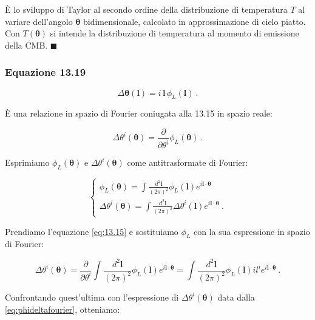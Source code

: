 \documentclass[a4paper,10pt]{article}
\newcommand{\B}{\boldsymbol}
\begin{document}
È lo sviluppo di Taylor al secondo ordine della distribuzione di temperatura $T$ al variare dell'angolo $\B\theta$ bidimensionale, calcolato in approssimazione di cielo piatto. 
Con $T(\B \theta)$ si intende la distribuzione di temperatura al momento di emissione della CMB. \hfill $\blacksquare$





\subsubsection*{Equazione 13.19}

\begin{equation} \label{eq:13.19}
    \Delta \B{\theta}(\B l) = i \, \B l \, \phi_L(\B l) \ .
\end{equation}

È una relazione in spazio di Fourier coniugata alla 13.15 in spazio reale:

\begin{equation} \label{eq:13.15}
    \Delta \theta^i (\B\theta) = \frac{\partial}{\partial \theta^i} \phi_L(\B \theta) \ .
\end{equation}

Esprimiamo $\phi_L(\B \theta)$ e $\Delta \theta^i (\B\theta)$ come antitrasformate di Fourier:

\begin{equation} \label{eq:phideltafourier}
\begin{cases}
    \phi_L(\B \theta) = \displaystyle \int \frac{d^2 \B l}{(2\pi)^2} \phi_L(\B l) e^{i \B l \cdot \B \theta} \\[3mm]
    \Delta \theta^i (\B\theta) = \displaystyle \int \frac{d^2 \B l}{(2\pi)^2} \Delta \theta^i (\B l) e^{i \B l \cdot \B \theta} \ .
\end{cases}
\end{equation}

Prendiamo l'equazione \eqref{eq:13.15} e sostituiamo $\phi_L$ con la sua espressione in spazio di Fourier:

\begin{equation}
    \Delta \theta^i (\B\theta) = 
    \frac{\partial}{\partial \theta^i} \displaystyle \int \frac{d^2 \B l}{(2\pi)^2} \phi_L (\B l) e^{i \B l \cdot \B \theta} = 
    \displaystyle \int \frac{d^2 \B l}{(2\pi)^2} \phi_L (\B l) i  l^i e^{i \B l \cdot \B \theta} \ .
\end{equation}

Confrontando quest'ultima con l'espressione di $\Delta \theta^i (\B\theta)$ data dalla \eqref{eq:phideltafourier}, otteniamo:
\end{document}
